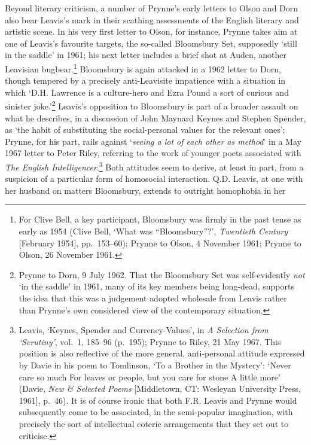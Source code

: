 \documentclass[]{article}
\begin{document}
Beyond literary criticism, a number of Prynne's early letters to Olson
and Dorn also bear Leavis's mark in their scathing assessments of the
English literary and artistic scene. In his very first letter to Olson,
for instance, Prynne takes aim at one of Leavis's favourite targets, the
so-called Bloomsbury Set, supposedly `still in the saddle' in 1961; his
next letter includes a brief shot at Auden, another Leavisian
bugbear.\footnote{For Clive Bell, a key participant, Bloomsbury was
  firmly in the past tense as early as 1954 (Clive Bell, `What was
  ``Bloomsbury''?', \emph{Twentieth Century} {[}February 1954{]},
  pp.~153--60); Prynne to Olson, 4 November 1961; Prynne to Olson, 26
  November 1961.} Bloomsbury is again attacked in a 1962 letter to Dorn,
though tempered by a precisely anti-Leavisite impatience with a
situation in which `D.H. Lawrence is a culture-hero and Ezra Pound a
sort of curious and sinister joke.'\footnote{Prynne to Dorn, 9 July
  1962. That the Bloomsbury Set was self-evidently \emph{not} `in the
  saddle' in 1961, many of its key members being long-dead, supports the
  idea that this was a judgement adopted wholesale from Leavis rather
  than Prynne's own considered view of the contemporary situation.}
Leavis's opposition to Bloomsbury is part of a broader assault on what
he describes, in a discussion of John Maynard Keynes and Stephen
Spender, as `the habit of substituting the social-personal values for
the relevant ones'; Prynne, for his part, rails against `\emph{seeing a
lot of each other as method}' in a May 1967 letter to Peter Riley,
referring to the work of younger poets associated with \emph{The English
Intelligencer}.\footnote{Leavis, `Keynes, Spender and Currency-Values',
  in \emph{A Selection from `Scrutiny'}, vol.~1, 185--96 (p.~195);
  Prynne to Riley, 21 May 1967. This position is also reflective of the
  more general, anti-personal attitude expressed by Davie in his poem to
  Tomlinson, `To a Brother in the Mystery': `Never care so much
  \textbar{} For leaves or people, but you care for stone \textbar{} A
  little more' (Davie, \emph{New \& Selected Poems} {[}Middletown, CT:
  Wesleyan University Press, 1961{]}, p.~46). It is of course ironic
  that both F.R. Leavis and Prynne would subsequently come to be
  associated, in the semi-popular imagination, with precisely the sort
  of intellectual coterie arrangements that they set out to criticise.}
Both attitudes seem to derive, at least in part, from a suspicion of a
particular form of homosocial interaction. Q.D. Leavis, at one with her
husband on matters Bloomsbury, extends to outright homophobia in her
\end{document}
